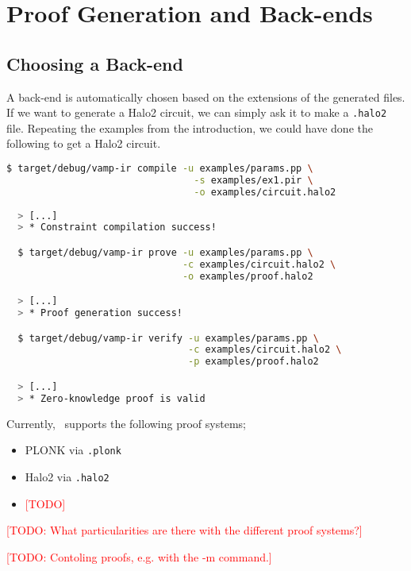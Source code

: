 \section{Proof Generation and Back-ends}

\subsection{Choosing a Back-end}

A back-end is automatically chosen based on the extensions of the generated files. If we want to generate a Halo2 circuit, we can simply ask it to make a \lstinline{.halo2} file. Repeating the examples from the introduction, we could have done the following to get a Halo2 circuit.

\begin{lstlisting}[language=bash]
  $ target/debug/vamp-ir compile -u examples/params.pp \
                                 -s examples/ex1.pir \
                                 -o examples/circuit.halo2
                                 
  > [...]
  > * Constraint compilation success!

  $ target/debug/vamp-ir prove -u examples/params.pp \
                               -c examples/circuit.halo2 \
                               -o examples/proof.halo2

  > [...]
  > * Proof generation success!

  $ target/debug/vamp-ir verify -u examples/params.pp \
                                -c examples/circuit.halo2 \
                                -p examples/proof.halo2

  > [...]
  > * Zero-knowledge proof is valid
\end{lstlisting}

Currently, \vampir\ supports the following proof systems;

\begin{itemize}
\item PLONK via \lstinline{.plonk}
\item Halo2 via \lstinline{.halo2}
\item \textcolor{red}{[TODO]}
\end{itemize}

\textcolor{red}{[TODO: What particularities are there with the different proof systems?]}

\textcolor{red}{[TODO: Contoling proofs, e.g. with the -m command.]}
